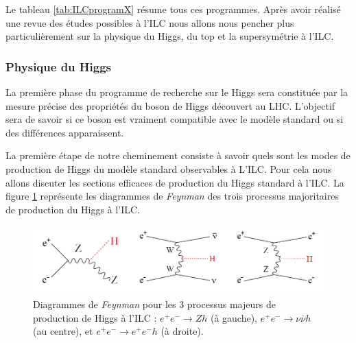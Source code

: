   \medskip

  Le tableau \ref{tab:ILCprogramX} r\'esume tous ces programmes. Apr\`es avoir r\'ealis\'e une revue des \'etudes possibles \`a l'ILC nous allons nous pencher plus particuli\`erement sur la physique du Higgs, du top et la supersym\'etrie \`a l'ILC.

   \subsubsection{Physique du Higgs}
  
   La premi\`ere phase du programme de recherche sur le Higgs sera constitu\'ee par la mesure pr\'ecise des propri\'et\'es du boson de Higgs d\'ecouvert au LHC. L'objectif sera de savoir si ce boson est vraiment compatible avec le mod\`ele standard ou si des diff\'erences apparaissent.
  
  \medskip

   La premi\`ere \'etape de notre cheminement consiste \`a savoir quels sont les modes de production de Higgs du mod\`ele standard observables \`a L'ILC. Pour cela nous allons discuter les sections efficaces de production du Higgs standard \`a l'ILC. La figure \ref{fig:feynmanHiggs2} repr\'esente les diagrammes de \textit{Feynman} des trois processus majoritaires de production du Higgs \`a l'ILC.
   
  \begin{figure}[!htb]
    \begin{center} 
      \includegraphics[scale=0.40]{./figures/feynman_Higgs.png}
      \caption{Diagrammes de \textit{Feynman} pour les 3 processus majeurs de production de Higgs \`a l'ILC : $e^+ e^- \rightarrow Z h$ (\`a gauche), $e^+ e^- \rightarrow \nu \overline{\nu} h$ (au centre), et $e^+ e^- \rightarrow e^+ e^- h$ (\`a droite). }
      \label{fig:feynmanHiggs2}
    \end{center}
  \end{figure}
   

